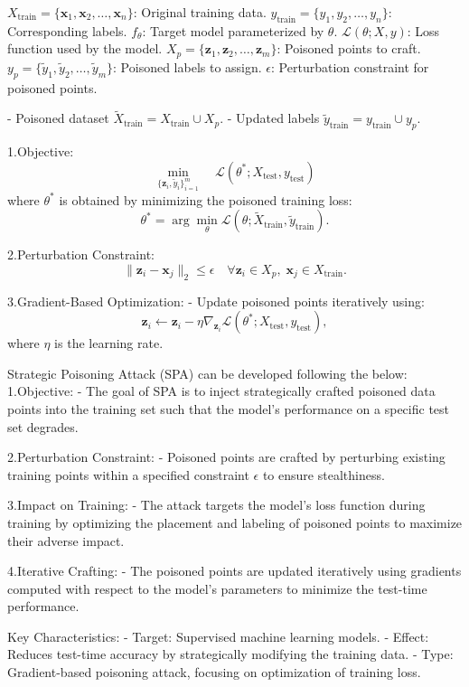 $X_{\text{train}} = \{\mathbf{x}_1, \mathbf{x}_2, \ldots, \mathbf{x}_n\}$: Original training data.
$y_{\text{train}} = \{y_1, y_2, \ldots, y_n\}$: Corresponding labels.
$f_\theta$: Target model parameterized by $\theta$.
$\mathcal{L}(\theta; X, y)$: Loss function used by the model.
$X_p = \{\mathbf{z}_1, \mathbf{z}_2, \ldots, \mathbf{z}_m\}$: Poisoned points to craft.
$y_p = \{\tilde{y}_1, \tilde{y}_2, \ldots, \tilde{y}_m\}$: Poisoned labels to assign.
$\epsilon$: Perturbation constraint for poisoned points.

- Poisoned dataset $\tilde{X}_{\text{train}} = X_{\text{train}} \cup X_p$.
- Updated labels $\tilde{y}_{\text{train}} = y_{\text{train}} \cup y_p$.

1.Objective:
   \[
   \min_{\{\mathbf{z}_i, \tilde{y}_i\}_{i=1}^m} \quad \mathcal{L}(\theta^*; X_{\text{test}}, y_{\text{test}})
   \]
   where $\theta^*$ is obtained by minimizing the poisoned training loss:
   \[
   \theta^* = \arg \min_\theta \mathcal{L}(\theta; \tilde{X}_{\text{train}}, \tilde{y}_{\text{train}}).
   \]

2.Perturbation Constraint:
   \[
   \|\mathbf{z}_i - \mathbf{x}_j\|_2 \leq \epsilon \quad \forall \mathbf{z}_i \in X_p, \; \mathbf{x}_j \in X_{\text{train}}.
   \]

3.Gradient-Based Optimization:
   - Update poisoned points iteratively using:
     \[
     \mathbf{z}_i \leftarrow \mathbf{z}_i - \eta \nabla_{\mathbf{z}_i} \mathcal{L}(\theta^*; X_{\text{test}}, y_{\text{test}}),
     \]
     where $\eta$ is the learning rate.

Strategic Poisoning Attack (SPA) can be developed following the below:
1.Objective:
   - The goal of SPA is to inject strategically crafted poisoned data points into the training set such that the model's performance on a specific test set degrades.

2.Perturbation Constraint:
   - Poisoned points are crafted by perturbing existing training points within a specified constraint $\epsilon$ to ensure stealthiness.

3.Impact on Training:
   - The attack targets the model's loss function during training by optimizing the placement and labeling of poisoned points to maximize their adverse impact.

4.Iterative Crafting:
   - The poisoned points are updated iteratively using gradients computed with respect to the model's parameters to minimize the test-time performance.

Key Characteristics:
- Target: Supervised machine learning models.
- Effect: Reduces test-time accuracy by strategically modifying the training data.
- Type: Gradient-based poisoning attack, focusing on optimization of training loss.

